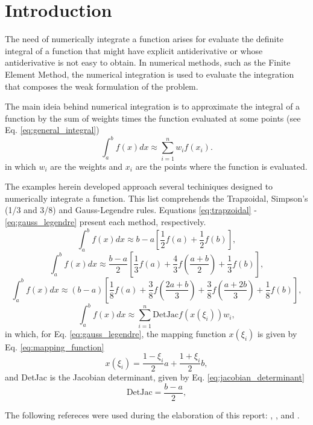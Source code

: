 \section{Introduction} \label{sec:introduction}
The need of numerically integrate a function arises for evaluate the definite integral of a function that might have explicit antiderivative or whose antiderivative is not easy to obtain. In numerical methods, such as the Finite Element Method, the numerical integration is used to evaluate the integration that composes the weak formulation of the problem. 
 
The main ideia behind numerical integration is to approximate the integral of a function by the sum of weights times the function evaluated at some points (see Eq. \eqref{eq:general_integral})
\begin{equation}
    \int_{a}^{b} f(x) dx \approx \sum_{i=1}^{n} w_i f(x_i).
    \label{eq:general_integral}
\end{equation}
in which $w_i$ are the weights and $x_i$ are the points where the function is evaluated.

The examples herein developed approach several techiniques designed to numerically integrate a function. This list comprehends the Trapzoidal, Simpson's (1/3 and 3/8) and Gauss-Legendre rules. Equations \eqref{eq:trapzoidal} - \eqref{eq:gauss_legendre} present each method, respectively.
\begin{equation}
    \int_{a}^{b} f(x) dx \approx b-a \left[ \frac{1}{2}f(a) + \frac{1}{2}f(b) \right],
    \label{eq:trapzoidal}
\end{equation}
\begin{equation}
    \int_{a}^{b} f(x) dx \approx \frac{b-a}{2} \left[ \frac{1}{3}f(a) + \frac{4}{3}f\left(\frac{a+b}{2}\right) + \frac{1}{3}f(b) \right],
    \label{eq:simpson_1_3}
\end{equation}
\begin{equation}
    \int_{a}^{b} f(x) dx\approx (b-a) \left[ \frac{1}{8}f(a) + \frac{3}{8}f\left(\frac{2a+b}{3}\right) + \frac{3}{8}f\left(\frac{a+2b}{3}\right) + \frac{1}{8}f(b) \right],
    \label{eq:simpson_3_8}
\end{equation}
\begin{equation}
    \int_{a}^{b} f(x) dx \approx \sum_{i=1}^{n} \text{DetJac} f\left(x(\xi_i)\right) w_i,
    \label{eq:gauss_legendre}
\end{equation}
in which, for Eq. \eqref{eq:gauss_legendre}, the mapping function $x(\xi_i)$ is given by Eq. \eqref{eq:mapping_function}
\begin{equation}
    x(\xi_i) = \frac{1 - \xi_i}{2} a + \frac{1 + \xi_i}{2} b,
    \label{eq:mapping_function}
\end{equation}
and DetJac is the Jacobian determinant, given by Eq. \eqref{eq:jacobian_determinant}
\begin{equation}
    \text{DetJac} = \frac{b-a}{2},
    \label{eq:jacobian_determinant}
\end{equation}

The following refereces were used during the elaboration of this report: \cite{becker1981finite}, \cite{burden2005student}, and \cite{cunhametodos}.